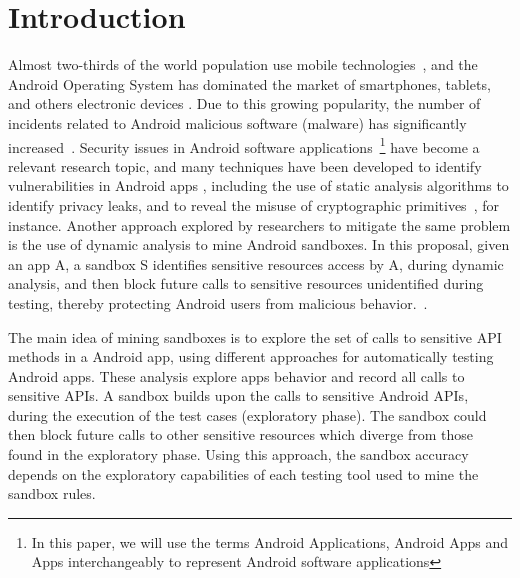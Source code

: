\section{Introduction}

Almost two-thirds of the world population use mobile technologies~\cite{Comscore}, and the Android Operating System has dominated the market of smartphones, tablets, and others electronic devices \cite{statcounter}. Due to this growing popularity, the number of incidents related to Android malicious software (malware) has significantly increased~\cite{DBLP:journals/comsur/FarukiBLGGCR15,DBLP:journals/csur/SufatrioTCT15}. Security issues in Android software applications~\footnote{In this paper, we will use the terms Android Applications, Android Apps and Apps interchangeably to represent Android software applications} have become a relevant research topic, and many techniques have been developed to identify vulnerabilities in Android apps \cite{DBLP:conf/pldi/ArztRFBBKTOM14}, including the use of static analysis algorithms to identify privacy leaks, and to reveal the misuse of cryptographic primitives~\cite{krueger:ecoop-2018,rahaman:ccs-2019}, for instance. Another approach explored by researchers to mitigate the same problem is the use of dynamic analysis to mine Android sandboxes. In this proposal, given an app A, a sandbox S identifies sensitive resources access by A, during dynamic analysis, and then block future calls to sensitive resources unidentified during testing, thereby protecting Android users from malicious behavior.~\cite{DBLP:conf/icse/JamrozikSZ16}.

The main idea of mining sandboxes is to explore the set of calls to sensitive API methods in a Android app, using different approaches for automatically testing Android apps. These analysis explore apps behavior and record all calls to sensitive APIs. A sandbox builds upon the calls to sensitive Android APIs, during the execution of the test cases (exploratory phase). The sandbox could then block future calls to other sensitive resources which diverge from those found in the exploratory phase. Using this approach, the sandbox accuracy depends on the exploratory capabilities of each testing tool used to mine the sandbox rules.
  
